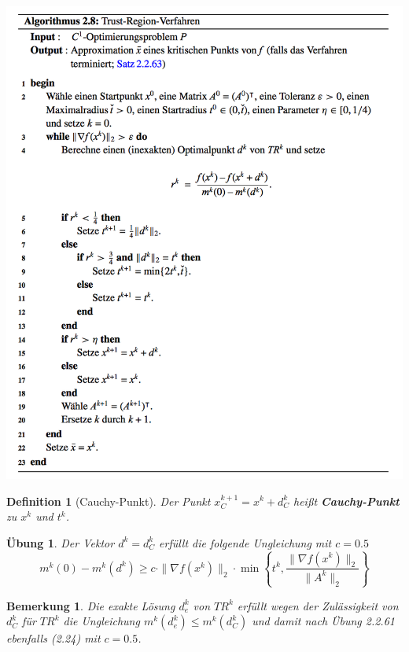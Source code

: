 \documentclass[11pt]{scrreprt}
\newcounter{thm}
\theoremstyle{thmstyle}
\numberwithin{thm}{section}
\newtheorem{bemerkung}[thm]{Bemerkung}
\newtheorem{definition}[thm]{Definition}
\newtheorem{uebung}[thm]{Übung}
\begin{document}
\begin{center}
	\includegraphics[scale=0.75]{img/a28}
\end{center}

\begin{definition}[Cauchy-Punkt]
	Der Punkt $x_C^{k+1}	 = x^k + d^k_C$ heißt \textbf{Cauchy-Punkt} zu $x^k$ und $t^k$.
\end{definition}

\begin{uebung}
	Der Vektor $d^k = d_C^k$ erfüllt die folgende Ungleichung mit $c = 0.5$
	\begin{equation}
		m^k(0) - m^k(d^k) \geq c \cdot \| \nabla f(x^k) \|_2 \cdot \min \left\{ t^k, \frac{\| \nabla f(x^k) \|_2}{\| A^k \|_2} \right\}  \tag*{(2.24)}
	\end{equation}
	$$ $$
\end{uebung}

\begin{bemerkung} 
	Die exakte Lösung $d_e^k$ von $TR^k$ erfüllt wegen der Zulässigkeit von $d_C^k$ für $TR^k$ die Ungleichung $m^k (d_e^k) \leq m^k (d_C^k)$ und damit nach Übung 2.2.61 ebenfalls (2.24) mit $c = 0.5$.	
\end{bemerkung}
\end{document}
